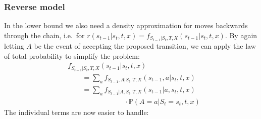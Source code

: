 \subsubsection{Reverse model}
\label{sec:TransDensitiesWithAcceptReverse}
In the lower bound we also need a density approximation for moves backwards through the chain, i.e.\ for $r(s_{t-1}|s_t, t, x) = f_{S_{t-1}|S_t,T, X}(s_{t-1} | s_t, t, x)$. By again letting $A$ be the event of accepting the proposed transition, we can apply the law of total probability to simplify the problem:
\begin{equation}
\begin{split}
&f_{S_{t-1}|S_t, T, X}(s_{t-1} | s_t, t, x) \\
&\qquad = \sum_{a} f_{S_{t-1}, A|S_t, T, X}(s_{t-1}, a | s_t, t, x) \\
&\qquad = \sum_{a} f_{S_{t-1} |A, S_t, T, X}(s_{t-1} | a, s_t, t, x) \\
&\qquad\qquad\qquad\qquad \cdot \mathbb{P}(A = a | S_t = s_t, t, x)
\end{split}
\end{equation}
The individual terms are now easier to handle:
